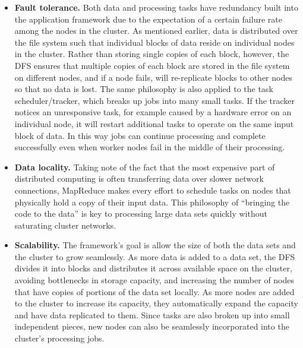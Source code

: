 \begin{itemize}
\item \textbf{Fault tolerance.} Both data and processing tasks have redundancy built into the application framework due to the expectation of a certain failure rate among the nodes in the cluster. As mentioned earlier, data is distributed over the file system such that individual blocks of data reside on individual nodes in the cluster. Rather than storing single copies of each block, however, the DFS ensures that multiple copies of each block are stored in the file system on different nodes, and if a node fails, will re-replicate blocks to other nodes so that no data is lost. The same philosophy is also applied to the task scheduler/tracker, which breaks up jobs into many small tasks. If the tracker notices an unresponsive task, for example caused by a hardware error on an individual node, it will restart additional tasks to operate on the same input block of data. In this way jobs can continue processing and complete successfully even when worker nodes fail in the middle of their processing.
\item \textbf{Data locality.} Taking note of the fact that the most expensive part of distributed computing is often transferring data over slower network connections, MapReduce makes every effort to schedule tasks on nodes that physically hold a copy of their input data. This philosophy of ``bringing the code to the data'' is key to processing large data sets quickly without saturating cluster networks.
\item \textbf{Scalability.} The framework's goal is allow the size of both the data sets and the cluster to grow seamlessly. As more data is added to a data set, the DFS divides it into blocks and distributes it across available space on the cluster, avoiding bottlenecks in storage capacity, and increasing the number of nodes that have copies of portions of the data set locally. As more nodes are added to the cluster to increase its capacity, they automatically expand the capacity and have data replicated to them. Since tasks are also broken up into small independent pieces, new nodes can also be seamlessly incorporated into the cluster's processing jobs.
\end{itemize}

